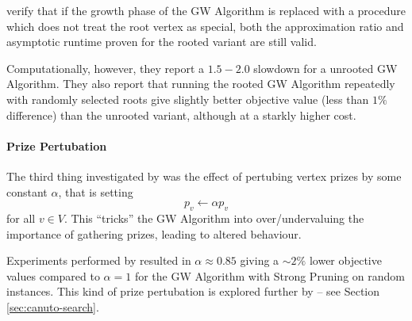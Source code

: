 \citet{Johnson:2000:PCS:338219.338637} verify that if the growth phase of the GW Algorithm
is replaced with a procedure which does not treat the root vertex as special, both the
approximation ratio and asymptotic runtime proven for the rooted variant are still valid.

Computationally, however, they report a $1.5-2.0$ slowdown for a unrooted GW Algorithm. They also
report that running the rooted GW Algorithm repeatedly with randomly selected roots give slightly
better objective value (less than $1\%$ difference) than the unrooted variant, although at a starkly
higher cost.
\paragraph{Prize Pertubation} The third thing investigated by \citet{Johnson:2000:PCS:338219.338637} was
the effect of pertubing vertex prizes by some constant $\alpha$, that is setting
$$p_v \gets \alpha p_v$$
for all $v \in V$. This ``tricks'' the GW Algorithm into over/undervaluing the importance of gathering prizes,
 leading to altered behaviour.

 Experiments performed by \citeauthor{Johnson:2000:PCS:338219.338637} resulted in $\alpha \approx 0.85$ giving a $\sim2\%$
 lower objective values compared to $\alpha = 1$ for the GW Algorithm with Strong Pruning on random instances.
  This kind of prize pertubation is explored further by \citet{canuto2001local} -- see Section \ref{sec:canuto-search}.


